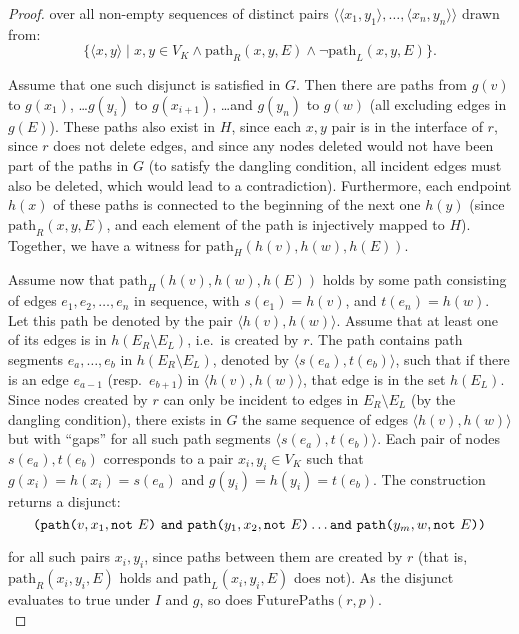 \documentclass{llncs}
\newcommand{\mt}[1]{\text{\tt{#1}}}
\begin{document}
\begin{proof}
		\noindent over all non-empty sequences of distinct pairs $\langle \langle x_1,y_1 \rangle, \dots, \langle x_n,y_n \rangle \rangle$ drawn from:
		\[ \{\langle x,y \rangle \mid x,y\in V_K \wedge \text{path}_R(x,y,E) \wedge \neg \text{path}_L(x,y,E)\}. \]
		
		\noindent Assume that one such disjunct is satisfied in $G$. Then there are paths from $g(v)$ to $g(x_1)$, \dots $g(y_i)$ to $g(x_{i+1})$, \dots and $g(y_n)$ to $g(w)$ (all excluding edges in $g(E)$). These paths also exist in $H$, since each $x,y$ pair is in the interface of $r$, since $r$ does not delete edges, and since any nodes deleted would not have been part of the paths in $G$ (to satisfy the dangling condition, all incident edges must also be deleted, which would lead to a contradiction). Furthermore, each endpoint $h(x)$ of these paths is connected to the beginning of the next one $h(y)$ (since $\text{path}_R(x,y,E)$, and each element of the path is injectively mapped to $H$). Together, we have a witness for $\text{path}_H(h(v),h(w),h(E))$.
		
		Assume now that $\text{path}_H(h(v),h(w),h(E))$ holds by some path consisting of edges $e_1,e_2,\dots,e_n$ in sequence, with $s(e_1) = h(v)$, and $t(e_n) = h(w)$. Let this path be denoted by the pair $\langle h(v), h(w) \rangle$. Assume that at least one of its edges is in $h(E_R\setminus E_L)$, i.e.\ is created by $r$. The path contains path segments $e_a, \dots , e_b$ in $h(E_R\setminus E_L)$, denoted by $\langle s(e_a), t(e_b) \rangle$, such that if there is an edge $e_{a-1}$ (resp.\ $e_{b+1}$) in $\langle h(v), h(w) \rangle$, that edge is in the set $h(E_L)$. Since nodes created by $r$ can only be incident to edges in $E_R\setminus E_L$ (by the dangling condition), there exists in $G$ the same sequence of edges $\langle h(v), h(w) \rangle$ but with ``gaps'' for all such path segments $\langle s(e_a), t(e_b) \rangle$. Each pair of nodes $s(e_a), t(e_b)$ corresponds to a pair $x_i,y_i \in V_K$ such that $g(x_i) = h(x_i) = s(e_a)$ and $g(y_i) = h(y_i) = t(e_b)$. The construction returns a disjunct:		
		\[ \mt{(}\mathtt{path}\mt{(}v,x_1,\mathtt{not}\ E\mt{)}\ \mathtt{and}\ \mathtt{path}\mt{(}y_1,x_2,\mathtt{not}\ E\mt{)} \dots \mathtt{and}\ \mathtt{path}\mt{(}y_m,w,\mathtt{not}\ E\mt{)}\mt{)} \]
		
		\noindent for all such pairs $x_i,y_i$, since paths between them are created by $r$ (that is, $\text{path}_R(x_i,y_i,E)$ holds and $\text{path}_L(x_i,y_i,E)$ does not). As the disjunct evaluates to true under $I$ and $g$, so does $\text{FuturePaths}(r,p)$.\\
		

\end{proof}
\end{document}
